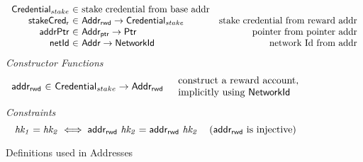 \begin{figure*}[hbt]
\begin{equation*}
\begin{array}{r@{~\in~}lr}
                          \StakeCredential & \text{stake credential from base
                                      addr}\\
      \fun{stakeCred_{r}} & \AddrRWD \to \StakeCredential & \text{stake credential
                                                   from reward addr}\\
      \fun{addrPtr} & \AddrP \to \Ptr
                    & \text{pointer from pointer addr}\\
      \fun{netId} & \Addr \to \NetworkId
                    & \text{network Id from addr}\\
    \end{array}
  \end{equation*}
  \emph{Constructor Functions}
  \begin{equation*}
    \begin{array}{r@{~\in~}lr}
      \fun{addr_{rwd}}
        & \Credential_{stake} \to \AddrRWD
        & \begin{array}{l}
            \text{construct a reward account,} \\
            \text{implicitly using $\NetworkId$}
          \end{array}
    \end{array}
  \end{equation*}
  \emph{Constraints}
  \begin{equation*}
    \mathit{hk_1} = \mathit{hk_2} \iff \mathsf{addr_{rwd}}~\mathit{hk_2} = \mathsf{addr_{rwd}}~\mathit{hk_2}
    ~~~ \left( \mathsf{addr_{rwd}} \text{ is injective} \right)
  \end{equation*}
  \caption{Definitions used in Addresses}
  \label{fig:defs:addresses}
\end{figure*}

\clearpage
